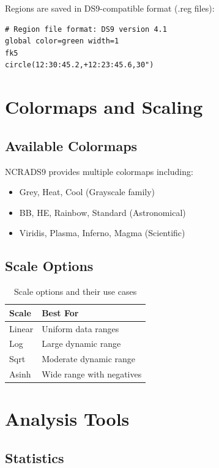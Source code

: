 \documentclass[11pt,a4paper]{report}
\begin{document}
Regions are saved in DS9-compatible format (.reg files):

\begin{lstlisting}
# Region file format: DS9 version 4.1
global color=green width=1
fk5
circle(12:30:45.2,+12:23:45.6,30")
\end{lstlisting}

\section{Colormaps and Scaling}

\subsection{Available Colormaps}

NCRADS9 provides multiple colormaps including:
\begin{itemize}
    \item Grey, Heat, Cool (Grayscale family)
    \item BB, HE, Rainbow, Standard (Astronomical)
    \item Viridis, Plasma, Inferno, Magma (Scientific)
\end{itemize}

\subsection{Scale Options}

\begin{table}[h]
\centering
\begin{tabular}{ll}
\toprule
\textbf{Scale} & \textbf{Best For} \\
\midrule
Linear & Uniform data ranges \\
Log & Large dynamic range \\
Sqrt & Moderate dynamic range \\
Asinh & Wide range with negatives \\
\bottomrule
\end{tabular}
\caption{Scale options and their use cases}
\end{table}

\section{Analysis Tools}

\subsection{Statistics}
\end{document}
